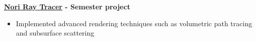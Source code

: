\textbf{\href{https://thfabian.github.io/nori-project/}{Nori Ray Tracer} - Semester project}
\begin{itemize}
 \item Implemented advanced rendering techniques such as volumetric path tracing and subsurface scattering
\end{itemize}
